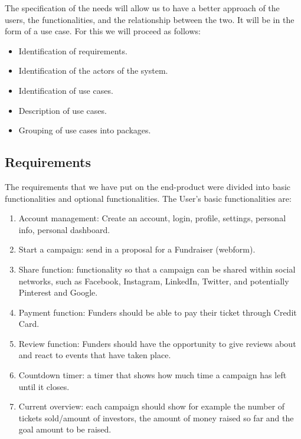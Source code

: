 The specification of the needs will allow us to have a better approach of the users, the functionalities, and the relationship between the two. It will be in the form of a use case. For this we will proceed as follows:

\begin{itemize}\addtolength{\itemsep}{-0.35\baselineskip}   
      \item 
      Identification of requirements.
      \item 
      Identification of the actors of the system.
      \item 
      Identification of use cases.
      \item 
      Description of use cases.
      \item 
      Grouping of use cases into packages.
\end{itemize}


\subsection{Requirements}
The requirements that we have put on the end-product were divided into basic functionalities and optional functionalities.
The User’s basic functionalities are:
\begin{enumerate}
    \item
          Account management: Create an account, login, profile, settings, personal info,
          personal dashboard.
    \item
          Start a campaign: send in a proposal for a Fundraiser (webform).
    \item
          Share function: functionality so that a campaign can be shared within social networks, such as Facebook, Instagram, LinkedIn, Twitter, and potentially Pinterest and Google.
    
    \item
          Payment function: Funders should be able to pay their ticket through Credit Card.
    \item
          Review function: Funders should have the opportunity to give reviews about and react to events
          that have taken place.
    \item
          Countdown timer: a timer that shows how much time a campaign has left until it closes.
    \item
          Current overview: each campaign should show for example the number of tickets sold/amount of investors, the amount of money raised so far and the goal amount to be raised.
\end{enumerate}


